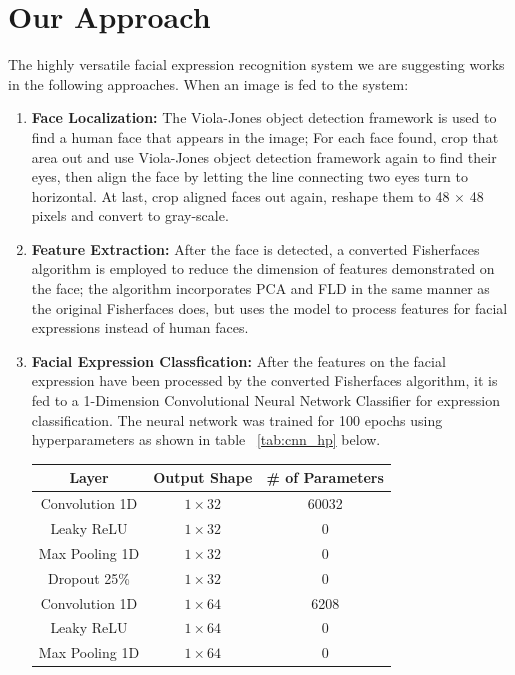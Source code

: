 \documentclass[10pt,twocolumn,letterpaper]{article}
\begin{document}
\section{Our Approach}
The highly versatile facial expression recognition system we are suggesting works in the following approaches. When an image is fed to the system: 
\begin{enumerate}
    \item \textbf{Face Localization: }The Viola-Jones object detection framework is used to find a human face that appears in the image; For each face found, crop that area out and use Viola-Jones object detection framework again to find their eyes, then align the face by letting the line connecting two eyes turn to horizontal. At last, crop aligned faces out again, reshape them to 48 $\times$ 48 pixels and convert to gray-scale.
    \item \textbf{Feature Extraction: }After the face is detected, a converted Fisherfaces algorithm is employed to reduce the dimension of features demonstrated on the face; the algorithm incorporates PCA and FLD in the same manner as the original Fisherfaces does, but uses the model to process features for facial expressions instead of human faces.
    \item \textbf{Facial Expression Classfication: }After the features on the facial expression have been processed by the converted Fisherfaces algorithm, it is fed to a 1-Dimension Convolutional Neural Network Classifier for expression classification. The neural network was trained for 100 epochs using hyperparameters as shown in table ~\ref{tab:cnn_hp} below. 
    \begin{table}[h!]
        \centering
        \begin{tabular}{|c|c|c|} \hline
            Layer & Output Shape & \# of Parameters \\ \hline\hline
            Convolution 1D & $1 \times 32$ & 60032 \\ \hline
            Leaky ReLU & $1 \times 32$ & 0 \\ \hline
            Max Pooling 1D & $1 \times 32$ & 0 \\ \hline
            Dropout 25\% & $1 \times 32$ & 0 \\ \hline
            Convolution 1D & $1 \times 64$ & 6208 \\ \hline
            Leaky ReLU & $1 \times 64$ & 0 \\ \hline
            Max Pooling 1D & $1 \times 64$ & 0 \\ \hline

\end{tabular}
\end{table}
\end{enumerate}
\end{document}
